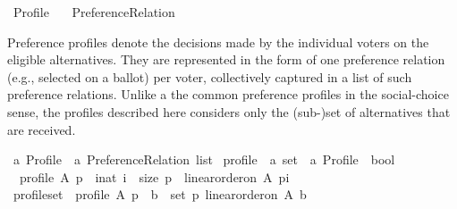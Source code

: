 %
\begin{isabellebody}%
%
%
\isadelimdocument
\isanewline
%
\endisadelimdocument
%
\isatagdocument
\isanewline
\isanewline
\isanewline
%
\isamarkuptrue%
%
\endisatagdocument
{\isafolddocument}%
%
\isadelimdocument
%
\endisadelimdocument
%
\isadelimtheory
%
\endisadelimtheory
%
\isatagtheory
{}\isamarkupfalse%
\ Profile\isanewline
\ \ \ Preference{\isacharunderscore}{\kern0pt}Relation\isanewline
{}%
\endisatagtheory
{\isafoldtheory}%
%
\isadelimtheory
%
\endisadelimtheory
%
\begin{isamarkuptext}%
Preference profiles denote the decisions made by the individual voters on
the eligible alternatives. They are represented in the form of one preference
relation (e.g., selected on a ballot) per voter, collectively captured in a
list of such preference relations.
Unlike a the common preference profiles in the social-choice sense, the
profiles described here considers only the (sub-)set of alternatives that are
received.%
\end{isamarkuptext}\isamarkuptrue%
%
\isadelimdocument
%
\endisadelimdocument
%
\isatagdocument
%
\isamarkuptrue%
%
\endisatagdocument
{\isafolddocument}%
%
\isadelimdocument
%
\endisadelimdocument
{}\isamarkupfalse%
\ {\isacharprime}{\kern0pt}a\ Profile\ {\isacharequal}{\kern0pt}\ {\isachardoublequoteopen}{\isacharparenleft}{\kern0pt}{\isacharprime}{\kern0pt}a\ Preference{\isacharunderscore}{\kern0pt}Relation{\isacharparenright}{\kern0pt}\ list{\isachardoublequoteclose}\isanewline
\isanewline
\isanewline
{}\isamarkupfalse%
\ profile\ {\isacharcolon}{\kern0pt}{\isacharcolon}{\kern0pt}\ {\isachardoublequoteopen}{\isacharprime}{\kern0pt}a\ set\ {\isasymRightarrow}\ {\isacharprime}{\kern0pt}a\ Profile\ {\isasymRightarrow}\ bool{\isachardoublequoteclose}\ \isanewline
\ \ {\isachardoublequoteopen}profile\ A\ p\ {\isasymequiv}\ {\isasymforall}i{\isacharcolon}{\kern0pt}{\isacharcolon}{\kern0pt}nat{\isachardot}{\kern0pt}\ i\ {\isacharless}{\kern0pt}\ size\ p\ {\isasymlongrightarrow}\ linear{\isacharunderscore}{\kern0pt}order{\isacharunderscore}{\kern0pt}on\ A\ {\isacharparenleft}{\kern0pt}p{\isacharbang}{\kern0pt}i{\isacharparenright}{\kern0pt}{\isachardoublequoteclose}\isanewline
\isanewline
{}\isamarkupfalse%
\ profile{\isacharunderscore}{\kern0pt}set\ {\isacharcolon}{\kern0pt}\ {\isachardoublequoteopen}profile\ A\ p\ {\isasymequiv}\ {\isacharparenleft}{\kern0pt}{\isasymforall}b\ {\isasymin}\ {\isacharparenleft}{\kern0pt}set\ p{\isacharparenright}{\kern0pt}{\isachardot}{\kern0pt}\ linear{\isacharunderscore}{\kern0pt}order{\isacharunderscore}{\kern0pt}on\ A\ b{\isacharparenright}{\kern0pt}{\isachardoublequoteclose}\isanewline

\end{isabellebody}
